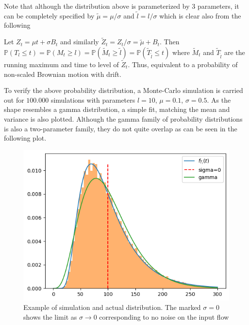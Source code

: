 \documentclass[../Thesis.tex]{subfiles}
\begin{document}
Note that although the distribution above is parameterized by 3 parameters, it can be completely specified by $\tilde{\mu} = \mu /\sigma$ and $\tilde{l}=l/\sigma$ which is clear also from the following

Let $Z_t = \mu t + \sigma B_t$ and similarly $\tilde{Z}_t = Z_t/\sigma = \tilde{\mu} + B_t$. Then
$\mathbb{P} \left(T_l \leq t \right)
    = \mathbb{P} \left( M_t \geq l \right)
    = \mathbb{P} \left( \tilde{M}_t \geq \tilde{l} \right)
    = \mathbb{P} \left( \tilde{T}_{ \tilde{l} } \leq t \right)$
where $\tilde{M}_t$ and $\tilde{T}_{\tilde{l}}$ are the running maximum and time to level of $\tilde{Z}_t$. Thus, equivalent to a probability of non-scaled Brownian motion with drift.

To verify the above probability distribution, a Monte-Carlo simulation is carried out for $100.000$ simulations with parameters $l=10$, $\mu = 0.1$, $\sigma = 0.5$. As the shape resembles a gamma distribution, a simple fit, matching the mean and variance is also plotted. Although the gamma family of probability distributions is also a two-parameter family, they do not quite overlap as can be seen in the following plot.

\begin{figure}[h]
    \centering
    \includegraphics[width=\linewidth]{figures/Brownian motion w. drift distribution and montecarlo.png}
    \caption{Example of simulation and actual distribution. The marked $\sigma=0$ shows the limit as $\sigma \to 0$ corresponding to no noise on the input flow}
    \label{fig:1}
\end{figure}
\end{document}

